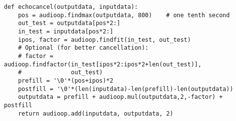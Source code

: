 \begin{verbatim}
def echocancel(outputdata, inputdata):
    pos = audioop.findmax(outputdata, 800)    # one tenth second
    out_test = outputdata[pos*2:]
    in_test = inputdata[pos*2:]
    ipos, factor = audioop.findfit(in_test, out_test)
    # Optional (for better cancellation):
    # factor = audioop.findfactor(in_test[ipos*2:ipos*2+len(out_test)], 
    #              out_test)
    prefill = '\0'*(pos+ipos)*2
    postfill = '\0'*(len(inputdata)-len(prefill)-len(outputdata))
    outputdata = prefill + audioop.mul(outputdata,2,-factor) + postfill
    return audioop.add(inputdata, outputdata, 2)
\end{verbatim}
